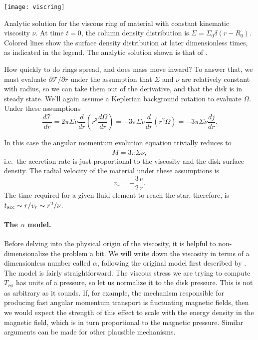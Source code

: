 \begin{marginfigure}
\texttt{[image: viscring]}
\caption[Viscous ring evolution]{
\label{fig:viscring}
Analytic solution for the viscous ring of material with constant kinematic viscosity $\nu$. At time $t=0$, the column density distribution is $\Sigma = \Sigma_0 \delta(r-R_0)$. Colored lines show the surface density distribution at later dimensionless times, as indicated in the legend. The analytic solution shown is that of \citet{pringle81a}.
}
\end{marginfigure}


How quickly to do rings spread, and does mass move inward? To answer that, we must evaluate $\partial \mathcal{T}/\partial r$ under the assumption that $\Sigma$ and $\nu$ are relatively constant with radius, so we can take them out of the derivative, and that the disk is in steady state. We'll again assume a Keplerian background rotation to evaluate $\Omega$. Under these assumptions
\begin{equation}
\frac{d\mathcal{T}}{dr} = 2\pi \Sigma \nu \frac{d}{dr}\left(r^3 \frac{d\Omega}{dr}\right) = -3\pi\Sigma \nu \frac{d}{dr}(r^2\Omega) = -3\pi \Sigma \nu \frac{dj}{dr}.
\end{equation}

In this case the angular momentum evolution equation trivially reduces to
\begin{equation}
\dot{M} = 3\pi\Sigma\nu,
\end{equation}
i.e.\ the accretion rate is just proportional to the viscosity and the disk surface density. The radial velocity of the material under these assumptions is
\begin{equation}
v_r = -\frac{3}{2} \frac{\nu}{r}.
\end{equation}
The time required for a given fluid element to reach the star, therefore, is $t_{\rm acc}\sim r/v_r \sim r^2/\nu$.

\paragraph{The $\alpha$ model.}

Before delving into the physical origin of the viscosity, it is helpful to non-dimensionalize the problem a bit. We will write down the viscosity in terms of a dimensionless number called $\alpha$, following the original model first described by \citet{shakura73a}. The model is fairly straightforward. The viscous stress we are trying to compute $T_{r\phi}$ has units of a pressure, so let us normalize it to the disk pressure. This is not as arbitrary as it sounds. If, for example, the mechanism responsible for producing fast angular momentum transport is fluctuating magnetic fields, then we would expect the strength of this effect to scale with the energy density in the magnetic field, which is in turn proportional to the magnetic pressure. Similar arguments can be made for other plausible mechanisms.

